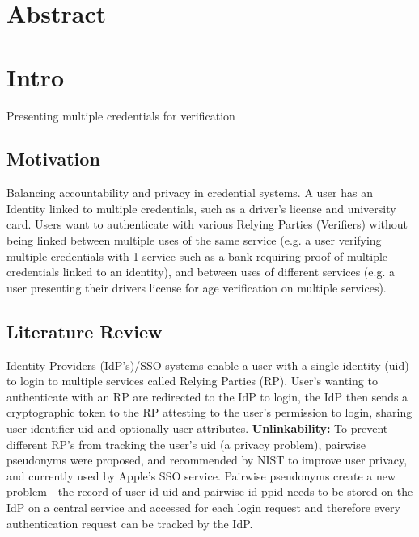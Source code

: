 \section{Abstract}



\section{Intro}



Presenting multiple credentials for verification 

\subsection{Motivation}
Balancing accountability and privacy in credential systems.
A user has an Identity linked to multiple credentials, such as a driver's license and university card. Users want to authenticate with various Relying Parties (Verifiers) without being linked between multiple uses of the same service (e.g. a user verifying multiple credentials with 1 service such as a bank requiring proof of multiple credentials linked to an identity), and between uses of different services (e.g. a user presenting their drivers license for age verification on multiple services).

\subsection{Literature Review}
Identity Providers (IdP's)/SSO systems enable a user with a single identity (uid) to login to multiple services called Relying Parties (RP). User's wanting to authenticate with an RP are redirected to the IdP to login, the IdP then sends a cryptographic token to the RP attesting to the user's permission to login, sharing user identifier uid and optionally user attributes.
\textbf{Unlinkability:} To prevent different RP's from tracking the user's uid (a privacy problem), pairwise pseudonyms were proposed, and recommended by NIST to improve user privacy, and currently used by Apple's SSO service. Pairwise pseudonyms create a new problem - the record of user id uid and pairwise id ppid needs to be stored on the IdP on a central service and accessed for each login request and therefore every authentication request can be tracked by the IdP. 

